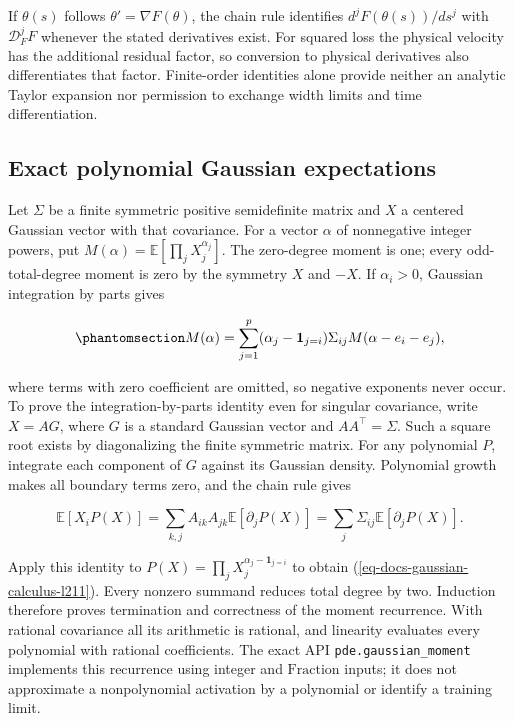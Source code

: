 \documentclass[
  11pt,
]{article}
\theoremstyle{definition}
\theoremstyle{plain}
\theoremstyle{plain}
\theoremstyle{plain}
\theoremstyle{remark}
\begin{document}
If \(\theta(s)\) follows \(\theta'=\nabla F(\theta)\), the chain rule
identifies \(d^jF(\theta(s))/ds^j\) with \(\mathcal{D}_F^jF\) whenever
the stated derivatives exist. For squared loss the physical velocity has
the additional residual factor, so conversion to physical derivatives
also differentiates that factor. Finite-order identities alone provide
neither an analytic Taylor expansion nor permission to exchange width
limits and time differentiation.

\subsection{Exact polynomial Gaussian
expectations}\label{sec-docs-gaussian-calculus-l203}

Let \(\Sigma\) be a finite symmetric positive semidefinite matrix and
\(X\) a centered Gaussian vector with that covariance. For a vector
\(\alpha\) of nonnegative integer powers, put
\(M(\alpha)=\mathbb{E}[\prod_jX_j^{\alpha_j}]\). The zero-degree moment
is one; every odd-total-degree moment is zero by the symmetry \(X\) and
\(-X\). If \(\alpha_i>0\), Gaussian integration by parts gives

\begin{equation}\protect\phantomsection\label{eq-docs-gaussian-calculus-l211}{
M(\alpha)=\sum_{j=1}^p(\alpha_j-\mathbf1_{j=i})\Sigma_{ij}
 M(\alpha-e_i-e_j),
}\end{equation}

where terms with zero coefficient are omitted, so negative exponents
never occur. To prove the integration-by-parts identity even for
singular covariance, write \(X=AG\), where \(G\) is a standard Gaussian
vector and \(AA^{\top}=\Sigma\). Such a square root exists by
diagonalizing the finite symmetric matrix. For any polynomial \(P\),
integrate each component of \(G\) against its Gaussian density.
Polynomial growth makes all boundary terms zero, and the chain rule
gives

\[
\mathbb E[X_iP(X)]
=\sum_{k,j}A_{ik}A_{jk}\mathbb E[\partial_jP(X)]
=\sum_j\Sigma_{ij}\mathbb E[\partial_jP(X)].
\]

Apply this identity to \(P(X)=\prod_jX_j^{\alpha_j-\mathbf{1}_{j=i}}\)
to obtain (\ref{eq-docs-gaussian-calculus-l211}). Every nonzero summand
reduces total degree by two. Induction therefore proves termination and
correctness of the moment recurrence. With rational covariance all its
arithmetic is rational, and linearity evaluates every polynomial with
rational coefficients. The exact API \texttt{pde.gaussian\_moment}
implements this recurrence using integer and \(\mathrm{Fraction}\)
inputs; it does not approximate a nonpolynomial activation by a
polynomial or identify a training limit.
\end{document}
